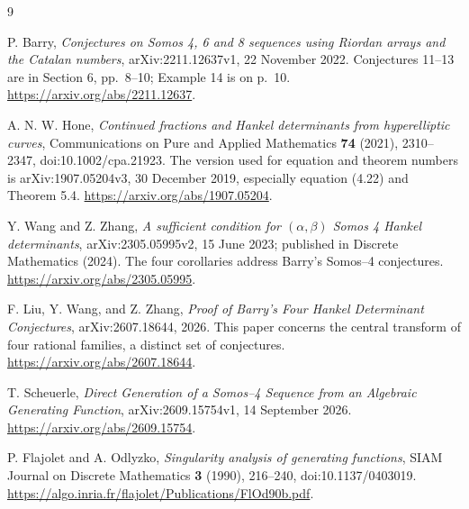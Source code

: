 \documentclass[11pt,letterpaper]{article}
\numberwithin{equation}{section}
\theoremstyle{definition}
\begin{document}
\begin{thebibliography}{9}

P. Barry,
\emph{Conjectures on Somos 4, 6 and 8 sequences using Riordan arrays and the
Catalan numbers}, arXiv:2211.12637v1, 22 November 2022.
Conjectures 11--13 are in Section 6, pp.\ 8--10; Example 14 is on p.\ 10.
\url{https://arxiv.org/abs/2211.12637}.

A. N. W. Hone,
\emph{Continued fractions and Hankel determinants from hyperelliptic curves},
Communications on Pure and Applied Mathematics \textbf{74} (2021),
2310--2347, doi:10.1002/cpa.21923.
The version used for equation and theorem numbers is arXiv:1907.05204v3,
30 December 2019, especially equation (4.22) and Theorem 5.4.
\url{https://arxiv.org/abs/1907.05204}.

Y. Wang and Z. Zhang,
\emph{A sufficient condition for $(\alpha,\beta)$ Somos 4 Hankel determinants},
arXiv:2305.05995v2, 15 June 2023; published in Discrete Mathematics (2024).
The four corollaries address Barry's Somos--4 conjectures.
\url{https://arxiv.org/abs/2305.05995}.

F. Liu, Y. Wang, and Z. Zhang,
\emph{Proof of Barry's Four Hankel Determinant Conjectures},
arXiv:2607.18644, 2026. This paper concerns the central transform of four
rational families, a distinct set of conjectures.
\url{https://arxiv.org/abs/2607.18644}.

T. Scheuerle,
\emph{Direct Generation of a Somos--4 Sequence from an Algebraic Generating
Function}, arXiv:2609.15754v1, 14 September 2026.
\url{https://arxiv.org/abs/2609.15754}.

P. Flajolet and A. Odlyzko,
\emph{Singularity analysis of generating functions},
SIAM Journal on Discrete Mathematics \textbf{3} (1990), 216--240,
doi:10.1137/0403019.
\url{https://algo.inria.fr/flajolet/Publications/FlOd90b.pdf}.

\end{thebibliography}
\end{document}

